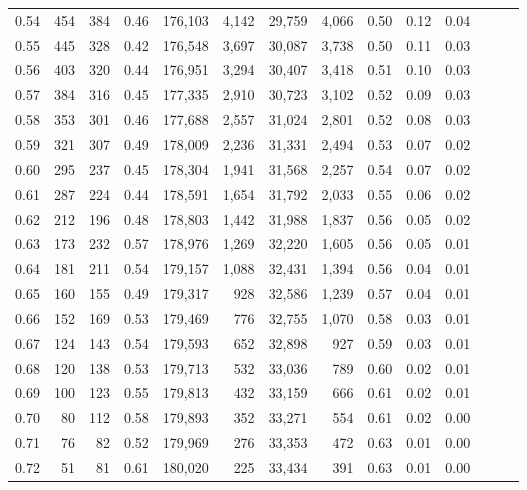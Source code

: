 \begin{tabular}{rrrrrrrrrrrrrr}
0.54 &    454 &    384 &  0.46 &  176,103 &    4,142 &  29,759 &   4,066 &  0.50 &  0.12 &      0.04 \\
0.55 &    445 &    328 &  0.42 &  176,548 &    3,697 &  30,087 &   3,738 &  0.50 &  0.11 &      0.03 \\
0.56 &    403 &    320 &  0.44 &  176,951 &    3,294 &  30,407 &   3,418 &  0.51 &  0.10 &      0.03 \\
0.57 &    384 &    316 &  0.45 &  177,335 &    2,910 &  30,723 &   3,102 &  0.52 &  0.09 &      0.03 \\
0.58 &    353 &    301 &  0.46 &  177,688 &    2,557 &  31,024 &   2,801 &  0.52 &  0.08 &      0.03 \\
0.59 &    321 &    307 &  0.49 &  178,009 &    2,236 &  31,331 &   2,494 &  0.53 &  0.07 &      0.02 \\
0.60 &    295 &    237 &  0.45 &  178,304 &    1,941 &  31,568 &   2,257 &  0.54 &  0.07 &      0.02 \\
0.61 &    287 &    224 &  0.44 &  178,591 &    1,654 &  31,792 &   2,033 &  0.55 &  0.06 &      0.02 \\
0.62 &    212 &    196 &  0.48 &  178,803 &    1,442 &  31,988 &   1,837 &  0.56 &  0.05 &      0.02 \\
0.63 &    173 &    232 &  0.57 &  178,976 &    1,269 &  32,220 &   1,605 &  0.56 &  0.05 &      0.01 \\
0.64 &    181 &    211 &  0.54 &  179,157 &    1,088 &  32,431 &   1,394 &  0.56 &  0.04 &      0.01 \\
0.65 &    160 &    155 &  0.49 &  179,317 &      928 &  32,586 &   1,239 &  0.57 &  0.04 &      0.01 \\
0.66 &    152 &    169 &  0.53 &  179,469 &      776 &  32,755 &   1,070 &  0.58 &  0.03 &      0.01 \\
0.67 &    124 &    143 &  0.54 &  179,593 &      652 &  32,898 &     927 &  0.59 &  0.03 &      0.01 \\
0.68 &    120 &    138 &  0.53 &  179,713 &      532 &  33,036 &     789 &  0.60 &  0.02 &      0.01 \\
0.69 &    100 &    123 &  0.55 &  179,813 &      432 &  33,159 &     666 &  0.61 &  0.02 &      0.01 \\
0.70 &     80 &    112 &  0.58 &  179,893 &      352 &  33,271 &     554 &  0.61 &  0.02 &      0.00 \\
0.71 &     76 &     82 &  0.52 &  179,969 &      276 &  33,353 &     472 &  0.63 &  0.01 &      0.00 \\
0.72 &     51 &     81 &  0.61 &  180,020 &      225 &  33,434 &     391 &  0.63 &  0.01 &      0.00 \\

\end{tabular}
